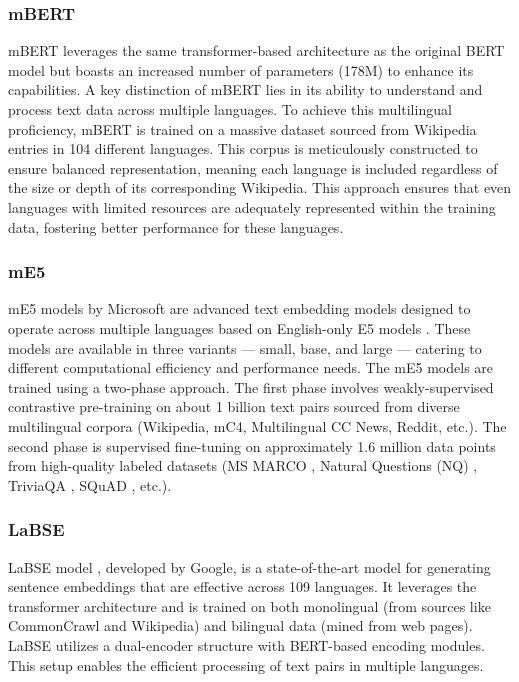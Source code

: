 \subsubsection{mBERT} \label{model:mbert}
\ac{mBERT} \cite{bert_mbert} leverages the same transformer-based architecture as the original \ac{BERT} model but boasts an increased number of parameters (178M) to enhance its capabilities.
A key distinction of \ac{mBERT} lies in its ability to understand and process text data across multiple languages.
To achieve this multilingual proficiency, \ac{mBERT} is trained on a massive dataset sourced from Wikipedia entries in 104 different languages.
This corpus is meticulously constructed to ensure balanced representation, meaning each language is included regardless of the size or depth of its corresponding Wikipedia.
This approach ensures that even languages with limited resources are adequately represented within the training data, fostering better performance for these languages.

\subsubsection{\ac{mE5}} \label{model:me5}
\ac{mE5} models by Microsoft \cite{mE5} are advanced text embedding models designed to operate across multiple languages based on English-only E5 models \cite{E5}.
These models are available in three variants — small, base, and large — catering to different computational efficiency and performance needs.
The \ac{mE5} models are trained using a two-phase approach.
The first phase involves weakly-supervised contrastive pre-training on about 1 billion text pairs sourced from diverse multilingual corpora (Wikipedia, mC4, Multilingual CC News, Reddit, etc.).
The second phase is supervised fine-tuning on approximately 1.6 million data points from high-quality labeled datasets (MS MARCO \cite{ms_marco_dataset}, Natural Questions (NQ) \cite{NQ_dataset}, TriviaQA \cite{TriviaQA}, SQuAD \cite{SQuAD}, etc.).

\subsubsection{LaBSE} \label{model:labse}
\ac{LaBSE} model \cite{LaBSE}, developed by Google, is a state-of-the-art model for generating sentence embeddings that are effective across 109 languages.
It leverages the transformer architecture and is trained on both monolingual (from sources like CommonCrawl \cite{commoncrawl} and Wikipedia) and bilingual data (mined from web pages).
LaBSE utilizes a dual-encoder structure with \ac{BERT}-based encoding modules.
This setup enables the efficient processing of text pairs in multiple languages.

